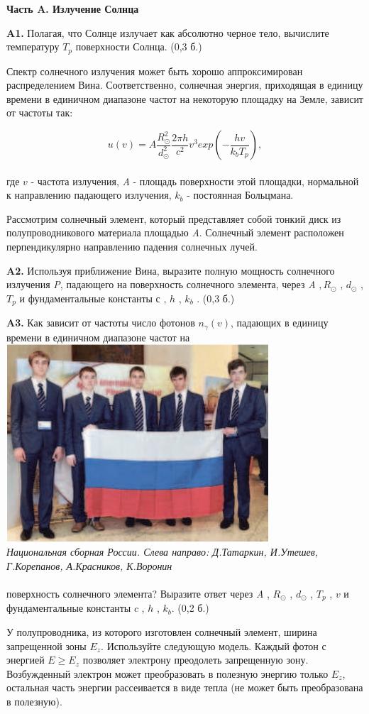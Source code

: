 {\begin{multicols}{2}
\textbf{Часть A. Излучение Солнца}\par
\textbf{A1.}
 Полагая, что Солнце излучает как абсолютно черное
тело, вычислите температуру $T_p$ поверхности Солнца.
(0,3 б.)\\\par
Спектр солнечного излучения может быть хорошо аппроксимирован распределением Вина. Соответственно, солнечная энергия, приходящая в единицу времени в единичном
диапазоне частот на некоторую площадку на Земле, зависит
от частоты так:\par
$$u(v)=A\frac{R^2_\odot}{d^2_\odot}\frac{2\pi h}{c^2}v^3exp(-\frac{hv}{k_{b}T_{p}}),$$\\
где $v$ - частота излучения, \textit{A} - площадь поверхности этой
площадки, нормальной к направлению падающего излучения, $k_{b}$ - постоянная Больцмана.\par
Рассмотрим солнечный элемент, который представляет
собой тонкий диск из полупроводникового материала площадью \textit{A}. Солнечный элемент расположен перпендикулярно
направлению падения солнечных лучей.\\\par
\textbf{A2.}
Используя приближение Вина, выразите полную мощность солнечного излучения \textit{P}, падающего на поверхность
солнечного элемента, через \textit{A} $, R_\odot$ , $d_\odot$ , $T_p$ и фундаментальные константы $с$ , $h$ , $k_b$ . (0,3 б.)\par
\textbf{A3.}
 Как зависит от частоты число фотонов $n_\gamma (v)$, падающих в единицу времени в единичном диапазоне частот на\\
\includegraphics[height=2.9in]{image.png} \\
\fontsize{10}{11}\selectfont
\textit{Национальная сборная России. Слева направо: Д.Татаркин, И.Утешев, Г.Корепанов, А.Красников, К.Воронин}\\\\
поверхность солнечного элемента? Выразите ответ через \textit{A} , $R_\odot$ , $d_\odot$ , $T_p$ , $v$ и фундаментальные константы $c$ , $h$ , $k_b$.
(0,2 б.)\par
У полупроводника, из которого изготовлен солнечный
элемент, ширина запрещенной зоны $E_z$. Используйте следующую модель. Каждый фотон с энергией $E \geq E_z$
 позволяет электрону преодолеть запрещенную зону. Возбужденный
электрон может преобразовать в полезную энергию только
$E_z$, остальная часть энергии рассеивается в виде тепла (не
может быть преобразована в полезную).\par


\end{multicols}}
